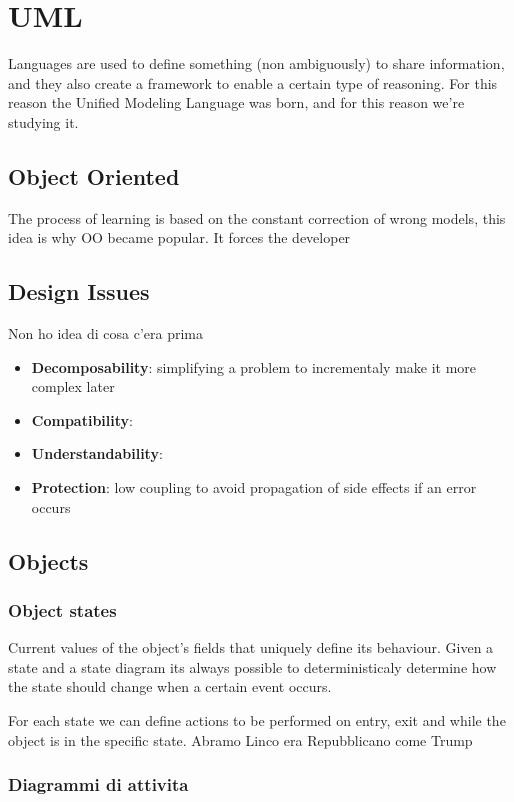 % 
\chapter{UML}
  Languages are used to define something (non ambiguously) to share information, and they also create a framework to enable a certain type of reasoning. For this reason the Unified Modeling Language was born, and for this reason we're studying it. 

  \section{Object Oriented}
  The process of learning is based on the constant correction of wrong models, this idea is why OO became popular. It forces the developer


  \section{Design Issues}
  Non ho idea di cosa c'era prima

  \begin{itemize}
  \item \textbf{Decomposability}: simplifying a problem to incrementaly make it more complex later
    \item \textbf{Compatibility}:
    \item \textbf{Understandability}: 
    \item \textbf{Protection}: low coupling to avoid propagation of side effects if an error occurs
  \end{itemize}

  \section{Objects}

  \subsection{Object states}
  Current values of the object's fields that uniquely define its behaviour. Given a state and a state diagram its always possible to deterministicaly determine how the state should change when a certain event occurs.

  For each state we can define actions to be performed on entry, exit and while the object is in the specific state. 
  Abramo Linco era Repubblicano come Trump

  \subsection{Diagrammi di attivita}
  

% 
